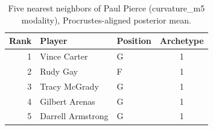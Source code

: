 \begin{table}[htbp]
  \centering\small
  \begin{tabular}{rllc}
    \toprule
    Rank & Player & Position & Archetype \\
    \midrule
    1 & Vince Carter & G & 1 \\
    2 & Rudy Gay & F & 1 \\
    3 & Tracy McGrady & G & 1 \\
    4 & Gilbert Arenas & G & 1 \\
    5 & Darrell Armstrong & G & 1 \\
    \bottomrule
  \end{tabular}
  \caption{Five nearest neighbors of Paul Pierce (curvature_m5 modality), Procrustes-aligned posterior mean.}
  \label{tab:Paul_Pierce_neighbors_curvature_m5}
\end{table}

